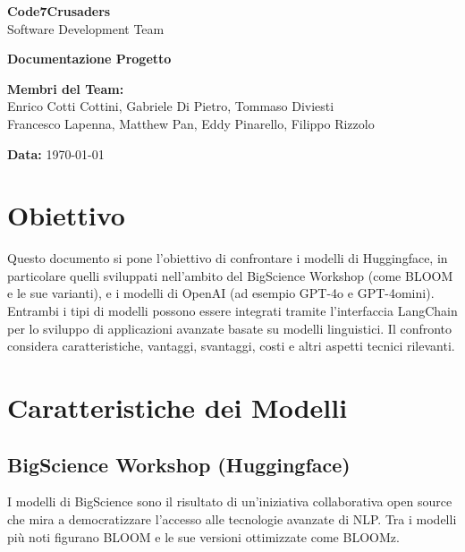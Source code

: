 \documentclass{article}
\begin{document}
\begin{titlepage}
    {\Huge \textbf{Code7Crusaders}}\\
    \vspace{0.5cm}
    {\Large Software Development Team}\\
    \vspace{2cm}
    
    {\large \textbf{Documentazione Progetto}}\\
    \vspace{5cm}

    \textbf{Membri del Team:}\\
    Enrico Cotti Cottini, Gabriele Di Pietro, Tommaso Diviesti \\
    Francesco Lapenna, Matthew Pan, Eddy Pinarello, Filippo Rizzolo \\
    \vspace{0.5cm}
    
    {\large \textbf{Data:}} \today\\
    
    \vspace{1cm}
\end{titlepage}

\newpage
\tableofcontents
\newpage

\newpage
\listoffigures
\newpage

\section{Obiettivo}
Questo documento si pone l'obiettivo di confrontare i modelli di Huggingface, in particolare quelli sviluppati nell'ambito del BigScience Workshop (come BLOOM e le sue varianti), e i modelli di OpenAI (ad esempio GPT-4o e GPT-4omini). Entrambi i tipi di modelli possono essere integrati tramite l'interfaccia LangChain per lo sviluppo di applicazioni avanzate basate su modelli linguistici. Il confronto considera caratteristiche, vantaggi, svantaggi, costi e altri aspetti tecnici rilevanti.

\section{Caratteristiche dei Modelli}

\subsection{BigScience Workshop (Huggingface)}
I modelli di BigScience sono il risultato di un'iniziativa collaborativa open source che mira a democratizzare l'accesso alle tecnologie avanzate di NLP. Tra i modelli più noti figurano BLOOM e le sue versioni ottimizzate come BLOOMz.
\end{document}

